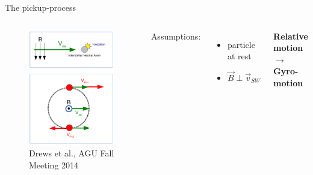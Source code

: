 \documentclass{beamer}
\begin{document}
\begin{frame}{The pickup-process}
\begin{columns}
	\column{4.5cm}
		\flushright
		\begin{figure}
		\includegraphics[scale=0.25]{pictures/pu_process_1_2.png}
		\caption{\tiny{Drews et al., AGU Fall Meeting 2014}}
		\end{figure}
	\column{5cm}
	Assumptions:
	\begin{itemize}
		\item particle at rest
		\item $\vec{B} \perp \vec{v}_{SW}$
	\end{itemize}
	\vspace{1cm}
\textbf{	Relative motion \\
	$\rightarrow$ Gyro-motion }
\end{columns}
\end{frame}
\end{document}
